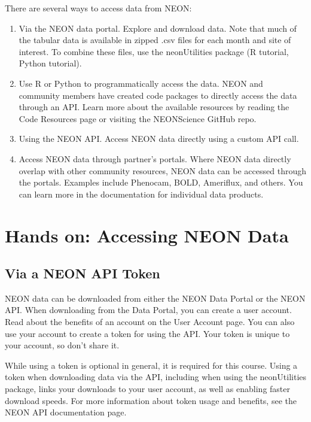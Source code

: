 \documentclass[]{book}
\providecommand{\tightlist}{%
  \setlength{\itemsep}{0pt}\setlength{\parskip}{0pt}}
\begin{document}
There are several ways to access data from NEON:

\begin{enumerate}
\def\labelenumi{\arabic{enumi}.}
\tightlist
\item
  Via the NEON data portal.
  Explore and download data. Note that much of the tabular data is available in zipped
  .csv files for each month and site of interest. To combine these files, use the
  neonUtilities package (R tutorial, Python tutorial).\\
\item
  Use R or Python to programmatically access the data. NEON and community members
  have created code packages to directly access the data through an API. Learn more
  about the available resources by reading the Code Resources page or visiting the
  NEONScience GitHub repo.\\
\item
  Using the NEON API. Access NEON data directly
  using a custom API call.
\item
  Access NEON data through partner's portals. Where NEON data directly overlap
  with other community resources, NEON data can be accessed through the portals.
  Examples include Phenocam, BOLD, Ameriflux, and others. You can learn more in the
  documentation for individual data products.
\end{enumerate}

\hypertarget{hands-on-accessing-neon-data}{%
\section{Hands on: Accessing NEON Data}\label{hands-on-accessing-neon-data}}

\hypertarget{via-a-neon-api-token}{%
\subsection{Via a NEON API Token}\label{via-a-neon-api-token}}

NEON data can be downloaded from either the NEON Data Portal or the NEON API.
When downloading from the Data Portal, you can create a user account. Read
about the benefits of an account on the User Account page. You can also use your account to create a token for using the
API. Your token is unique to your account, so don't share it.

While using a token is optional in general, it is required for this course. Using a token when downloading data via the API,
including when using the neonUtilities package, links your downloads to
your user account, as well as enabling faster download speeds. For more
information about token usage and benefits, see the
NEON API documentation page.
\end{document}
